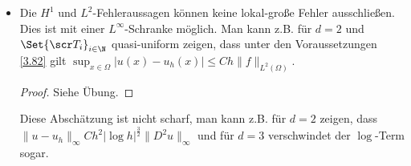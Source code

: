 \begin{st}
\begin{note}
\begin{itemize}
			\item
				Die $H^1$ und $L^2$-Fehleraussagen können keine lokal-große Fehler ausschließen.
				Dies ist mit einer $L^\infty$-Schranke möglich.
				Man kann z.B. für $d = 2$ und $\Set{\scr T_i}_{i \in \N}$ quasi-uniform zeigen, dass unter den Voraussetzungen \ref{3.82} gilt
				\begin{math}
					\sup_{x \in \Omega} |u(x) - u_h(x)|
					\le C h \|f\|_{L^2(\Omega)}.
				\end{math}
				\begin{proof}
					Siehe Übung.
				\end{proof}
				Diese Abschätzung ist nicht scharf, man kann z.B. für $d = 2$ zeigen, dass
				\begin{math}
					\|u - u_h\|_\infty C h^2 |\log h|^{\frac{3}{2}} \|D^2 u\|_\infty
				\end{math}
				und für $d = 3$ verschwindet der $\log$-Term sogar.
		\end{itemize}
	\end{note}
\end{st}

